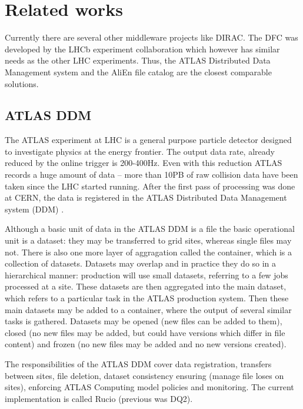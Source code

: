 \chapter{Related works}
\label{chap:relwork}

Currently there are several other middleware projects like DIRAC. The DFC was developed by the LHCb experiment 
collaboration which however has similar needs as the other LHC experiments. Thus, the ATLAS
Distributed Data Management system and the AliEn file catalog are the closest comparable solutions.


\section{ATLAS DDM}
The ATLAS experiment at LHC is a general purpose particle detector designed to investigate physics at the energy
frontier. The output data rate, already reduced by the online trigger is  200-400Hz. Even with this reduction 
ATLAS records a huge amount of data – more than 10PB of raw collision data have been taken since the LHC
started running. After the first pass of processing was done at CERN, the data is registered in the ATLAS 
Distributed Data Management system (DDM) \cite{ATLASDDM1}.

Although a basic unit of data in the ATLAS DDM is a file the basic operational unit is a dataset: they may be
transferred to grid sites, whereas single files may not. There is also one more layer of aggragation called the 
container, which is a collection of datasets. Datasets may overlap and in practice they do so in a 
hierarchical manner: production will use small datasets, referring to a few jobs processed at a site. These datasets
are then aggregated into the main dataset, which refers to a particular task in the ATLAS
production system. Then these main datasets may be added to a container, where the output of several 
similar tasks is gathered. Datasets may be opened (new files can be added to them), closed (no new files
may be added, but could have versions which differ in file content) and frozen (no new files may be added and no 
new versions created). 

The responsibilities of the ATLAS DDM cover data registration, transfers between sites, file deletion, dataset 
consistency ensuring (manage file loses on sites), enforcing ATLAS Computing model policies and monitoring. The
current implementation is called Rucio (previous was DQ2).


